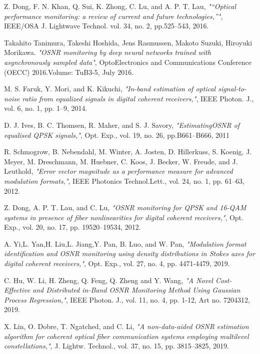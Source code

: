 \documentclass[12pt]{report}
\begin{document}
\begin{thebibliography}{9}
	
	Z. Dong, F. N. Khan, Q. Sui, K. Zhong, C. Lu, and A. P. T. Lau,
	\textit{"“Optical performance monitoring: a review of current and future technologies,”"}, 
	IEEE/OSA J. Lightwave Technol. vol. 34, no. 2, pp.525–543, 2016.
	
	Takahito Tanimura, Takeshi Hoshida, Jens Rasmussen, Makoto Suzuki, Hiroyuki Morikawa.
	\textit{"OSNR monitoring by deep neural networks trained with asynchronously sampled data"}, 
	OptoElectronics and Communications Conference (OECC) 2016.Volume: TuB3-5, July 2016.
	
	M. S. Faruk, Y. Mori, and K. Kikuchi,
	\textit{"In-band estimation of optical signal-to-noise ratio from equalized signals in digital coherent receivers,"}, 
	IEEE Photon. J., vol. 6, no. 1, pp. 1–9, 2014.
	
	D. J. Ives, B. C. Thomsen, R. Maher, and S. J. Savory,
	\textit{"EstimatingOSNR of equalised QPSK signals,"}, 
	Opt. Exp., vol. 19, no. 26, pp.B661–B666, 2011
	
	R. Schmogrow, B. Nebendahl, M. Winter, A. Josten, D. Hillerkuss, S. Koenig, J. Meyer, M. Dreschmann, M. Huebner, C. Koos, J. Becker, W. Freude, and J. Leuthold,
	\textit{"Error vector magnitude as a performance measure for advanced modulation formats,"}, 
	IEEE Photonics Technol.Lett., vol. 24, no. 1, pp. 61–63, 2012.
	
	Z. Dong, A. P. T. Lau, and C. Lu,
	\textit{"OSNR monitoring for QPSK and 16-QAM systems in presence of fiber nonlinearities for digital coherent receivers,"}, 
	Opt. Exp., vol. 20, no. 17, pp. 19520–19534, 2012.
	
	A. Yi,L. Yan,H. Liu,L. Jiang,Y. Pan, B. Luo, and W. Pan,
	\textit{"Modulation format identification and OSNR monitoring using density distributions in Stokes axes for digital coherent receivers,"}, 
	Opt. Exp., vol. 27, no. 4, pp. 4471-4479, 2019.
	
	C. Hu, W. Li, H. Zheng, Q. Feng, Q. Zheng and Y. Wang,
	\textit{"A Novel Cost-Effective and Distributed in-Band OSNR Monitoring Method Using Gaussian Process Regression,"}, 
	IEEE Photon. J., vol. 11, no. 4, pp. 1-12, Art no. 7204312, 2019.
	
	X. Lin, O. Dobre, T. Ngatched, and C. Li,
	\textit{"A non-data-aided OSNR estimation algorithm for coherent optical fiber communication systems employing multilevel constellations,"}, 
	J. Lightw. Technol., vol. 37, no. 15, pp. 3815–3825, 2019.
	

\end{thebibliography}
\end{document}
